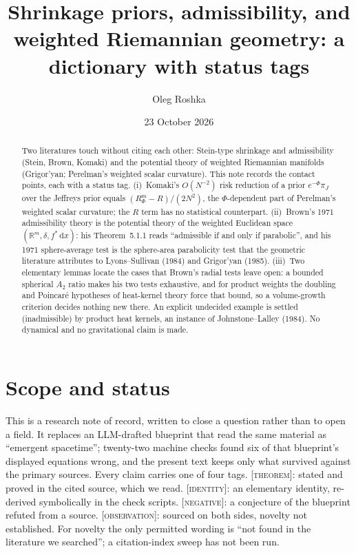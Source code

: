 \documentclass[a4paper,11pt,noarxiv]{quantumarticle}
\title{Shrinkage priors, admissibility, and weighted Riemannian
geometry: a dictionary with status tags}
\author{Oleg Roshka}
\affiliation{Independent Researcher \textnormal{--}
\href{https://orcid.org/0009-0009-3075-9417}{ORCID
0009-0009-3075-9417}}
\date{23 October 2026}
\newcommand{\R}{\mathbb{R}}
\newcommand{\Rm}{R^{\mathrm m}}
\newcommand{\dd}{\,\mathrm{d}}
\newcommand{\status}[1]{\textsc{\small [#1]}}
\theoremstyle{plain}
\theoremstyle{definition}
\theoremstyle{remark}
\begin{document}
\maketitle

\begin{abstract}
Two literatures touch without citing each other: Stein-type shrinkage
and admissibility (Stein, Brown, Komaki) and the potential theory of
weighted Riemannian manifolds (Grigor'yan; Perelman's weighted scalar
curvature). This note records the contact points, each with a status
tag. (i)~Komaki's $O(N^{-2})$ risk reduction of a prior
$e^{-\Phi}\pi_J$ over the Jeffreys prior equals $(\Rm_\Phi-R)/(2N^2)$,
the $\Phi$-dependent part of Perelman's weighted scalar curvature; the
$R$ term has no statistical counterpart. (ii)~Brown's 1971
admissibility theory is the potential theory of the weighted Euclidean
space $(\R^m,\delta,f^*\dd x)$: his Theorem~5.1.1 reads ``admissible
if and only if parabolic'', and his 1971 sphere-average test is the
sphere-area parabolicity test that the geometric literature attributes
to Lyons--Sullivan (1984) and Grigor'yan (1985). (iii)~Two elementary
lemmas locate the cases that Brown's radial tests leave open: a bounded
spherical $A_2$ ratio makes his two tests exhaustive, and for product
weights the doubling and Poincar\'e hypotheses of heat-kernel theory
force that bound, so a volume-growth criterion decides nothing new
there. An explicit undecided example is settled (inadmissible) by
product heat kernels, an instance of Johnstone--Lalley (1984). No
dynamical and no gravitational claim is made.
\end{abstract}

\section{Scope and status}\label{sec:scope}

This is a research note of record, written to close a question rather
than to open a field. It replaces an LLM-drafted blueprint that read
the same material as ``emergent spacetime''; twenty-two machine checks
found six of that blueprint's displayed equations wrong, and the
present text keeps only what survived against the primary sources.
Every claim carries one of four tags. \status{theorem}: stated and
proved in the cited source, which we read. \status{identity}: an
elementary identity, re-derived symbolically in the check scripts.
\status{negative}: a conjecture of the blueprint refuted from a source.
\status{observation}: sourced on both sides, novelty not established.
For novelty the only permitted wording is ``not found in the literature
we searched''; a citation-index sweep has not been run.
\end{document}
